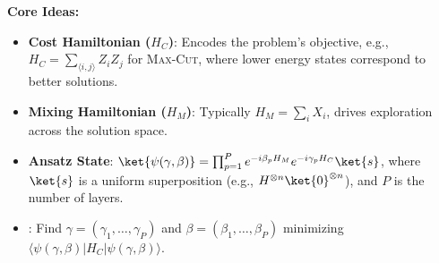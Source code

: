 \noindent
\textbf{Core Ideas:}
\begin{itemize}
  \item \textbf{Cost Hamiltonian ($H_C$)}: Encodes the problem's objective,
    e.g., $H_C = \sum_{\langle i,j \rangle} Z_i Z_j$ for \textsc{Max-Cut}, where lower
    energy states correspond to better solutions.

    \vspace{0.3cm}

  \item \textbf{Mixing Hamiltonian ($H_M$)}: Typically $H_M = \sum_i X_i$,
    drives exploration across the solution space.

    \vspace{0.3cm}

  \item \textbf{Ansatz State}: $\ket{\psi(\gamma, \beta)} = \prod_{p=1}^P
    e^{-i\beta_p H_M} e^{-i\gamma_p H_C} \ket{s}$, where $\ket{s}$ is a
    uniform superposition (e.g., $H^{\otimes n} \ket{0}^{\otimes n}$), and
    $P$ is the number of layers.

    \vspace{0.3cm}

  \item {}: Find $\gamma = (\gamma_1, \ldots, \gamma_P)$ and
    $\beta = (\beta_1, \ldots, \beta_P)$ minimizing $\langle \psi(\gamma,
    \beta) | H_C | \psi(\gamma, \beta) \rangle$.

\end{itemize}

\vspace{0.3cm}


\vspace{0.3cm}

